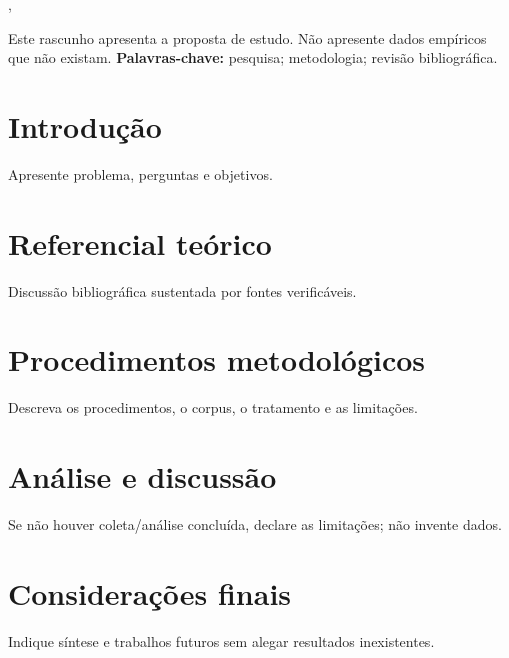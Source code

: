 \documentclass[12pt,oneside,a4paper,brazil]{abntex2}
\begin{document}
\imprimircapa
\begin{titlingpage}
\centering
{\large\imprimirinstituicao\par}
\vspace*{3cm}
{\large\imprimirautor\par}
\vspace*{2cm}
{\Large\bfseries\imprimirtitulo\par}
\vfill
{\imprimirpreambulo\par}
\vspace*{1cm}
{\imprimirorientador\par}
\vfill
{\imprimirlocal, \imprimirdata\par}
\end{titlingpage}
\begin{resumo}
Este rascunho apresenta a proposta de estudo. Não apresente dados empíricos que não existam.
\vspace{\onelineskip}
\noindent\textbf{Palavras-chave:} pesquisa; metodologia; revisão bibliográfica.
\end{resumo}
\tableofcontents*
\textual
\chapter{Introdução}
\label{sec:intro}
Apresente problema, perguntas e objetivos.
\chapter{Referencial teórico}
\label{sec:related_work}
Discussão bibliográfica sustentada por fontes verificáveis.
\chapter{Procedimentos metodológicos}
\label{sec:method}
Descreva os procedimentos, o corpus, o tratamento e as limitações.
\chapter{Análise e discussão}
\label{sec:experiments}
Se não houver coleta/análise concluída, declare as limitações; não invente dados.
\chapter{Considerações finais}
\label{sec:conclusion}
Indique síntese e trabalhos futuros sem alegar resultados inexistentes.
\postextual

\end{document}
